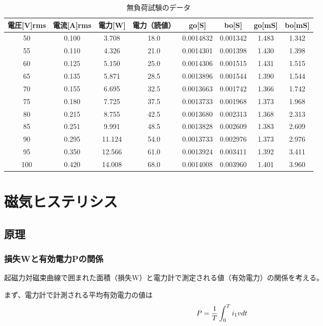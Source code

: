 \documentclass[11pt,a4j]{jsarticle}
\begin{document}
  
 \begin{table}[htb]
  \begin{center}
    \caption{無負荷試験のデータ}
    \begin{tabular}{cccccccc} \toprule
電圧[V]rms	&	電流[A]rms	&	電力[W]	&	電力（読値）	&	go[S]	&	bo[S]	&	go[mS]	&	bo[mS]	\\ \midrule
50	&	0.100 	&	3.708	&	18.0	&	0.0014832	&	0.001342 	&	1.483 	&	1.342 	\\
55	&	0.110 	&	4.326	&	21.0	&	0.0014301	&	0.001398 	&	1.430 	&	1.398 	\\
60	&	0.125 	&	5.150	&	25.0	&	0.0014306	&	0.001515 	&	1.431 	&	1.515 	\\
65	&	0.135 	&	5.871	&	28.5	&	0.0013896	&	0.001544 	&	1.390 	&	1.544 	\\
70	&	0.155 	&	6.695	&	32.5	&	0.0013663	&	0.001742 	&	1.366 	&	1.742 	\\
75	&	0.180 	&	7.725	&	37.5	&	0.0013733	&	0.001968 	&	1.373 	&	1.968 	\\
80	&	0.215 	&	8.755	&	42.5	&	0.0013680	&	0.002313 	&	1.368 	&	2.313 	\\
85	&	0.251 	&	9.991	&	48.5	&	0.0013828	&	0.002609 	&	1.383 	&	2.609 	\\
90	&	0.295 	&	11.124	&	54.0	&	0.0013733	&	0.002976 	&	1.373 	&	2.976 	\\
95	&	0.350 	&	12.566	&	61.0	&	0.0013924	&	0.003411 	&	1.392 	&	3.411 	\\
100	&	0.420 	&	14.008	&	68.0	&	0.0014008	&	0.003960 	&	1.401 	&	3.960 	\\ \bottomrule
    \end{tabular}
    \label{tab:price}
  \end{center}
\end{table}
  
 \section{磁気ヒステリシス}
 
  \subsection{原理}
  \subsubsection{損失Wと有効電力Pの関係}
  起磁力対磁束曲線で囲まれた面積（損失W）と電力計で測定される値（有効電力）の関係を考える。
  
  まず、電力計で計測される平均有効電力の値は
  \begin{equation}
   P = \frac{1}{T} \int_0^T i_1 v dt \\
  \end{equation}
  
\end{document}
